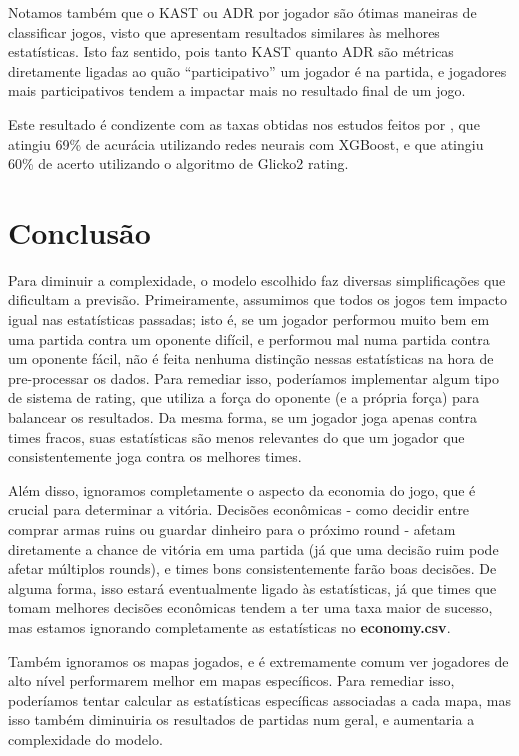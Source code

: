 \documentclass[12pt]{article}
\begin{document}
Notamos também que o KAST ou ADR por jogador são ótimas maneiras de classificar jogos, visto que apresentam resultados similares às melhores estatísticas. Isto faz sentido, pois tanto KAST quanto ADR são métricas diretamente ligadas ao quão ``participativo'' um jogador é na partida, e jogadores mais participativos tendem a impactar mais no resultado final de um jogo.

Este resultado é condizente com as taxas obtidas nos estudos feitos por \cite{navi}, que atingiu 69\% de acurácia utilizando redes neurais com XGBoost, e \cite{glicko2} que atingiu 60\% de acerto utilizando o algoritmo de Glicko2 rating.

\section{Conclusão}

Para diminuir a complexidade, o modelo escolhido faz diversas simplificações que dificultam a previsão. Primeiramente, assumimos que todos os jogos tem impacto igual nas estatísticas passadas; isto é, se um jogador performou muito bem em uma partida contra um oponente difícil, e performou mal numa partida contra um oponente fácil, não é feita nenhuma distinção nessas estatísticas na hora de pre-processar os dados. Para remediar isso, poderíamos implementar algum tipo de sistema de rating, que utiliza a força do oponente (e a própria força) para balancear os resultados. Da mesma forma, se um jogador joga apenas contra times fracos, suas estatísticas são menos relevantes do que um jogador que consistentemente joga contra os melhores times.

Além disso, ignoramos completamente o aspecto da economia do jogo, que é crucial para determinar a vitória. Decisões econômicas - como decidir entre comprar armas ruins ou guardar dinheiro para o próximo round - afetam diretamente a chance de vitória em uma partida (já que uma decisão ruim pode afetar múltiplos rounds), e times bons consistentemente farão boas decisões. De alguma forma, isso estará eventualmente ligado às estatísticas, já que times que tomam melhores decisões econômicas tendem a ter uma taxa maior de sucesso, mas estamos ignorando completamente as estatísticas no \textbf{economy.csv}.

Também ignoramos os mapas jogados, e é extremamente comum ver jogadores de alto nível performarem melhor em mapas específicos. Para remediar isso, poderíamos tentar calcular as estatísticas específicas associadas a cada mapa, mas isso também diminuiria os resultados de partidas num geral, e aumentaria a complexidade do modelo.
\end{document}

